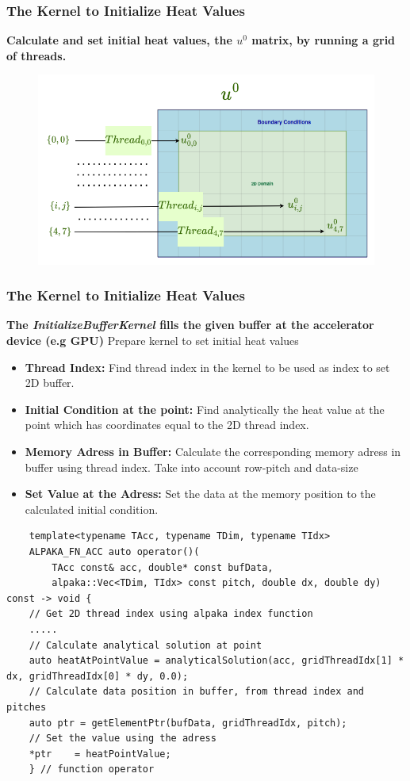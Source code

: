 \documentclass[9pt]{beamer}
\begin{document}
\begin{frame}
\frametitle{The Kernel to Initialize Heat Values}
\textbf{Calculate and set initial heat values, the $u^{0}$ matrix, by running a grid of threads.}
\hspace{2.0\baselineskip}
\begin{figure}
    \centering
    \includegraphics[width=0.8\linewidth]{Screenshot from 2024-09-19 18-45-43.png}
    \label{fig:enter-label}
\end{figure}
\end{frame}

\begin{frame}[fragile]
\frametitle{The Kernel to Initialize Heat Values}
\small

\textbf{ The \textit{InitializeBufferKernel} fills the given buffer at the accelerator device (e.g GPU)}
    \lstset{basicstyle=\ttfamily\scriptsize}
    Prepare kernel to set initial heat values
    \begin{itemize}
    \item \textbf{Thread Index:} Find thread index in the kernel to be used as index to set 2D buffer.
    \item \textbf{Initial Condition at the point:} Find analytically the heat value at the point which has coordinates equal to the 2D thread index.
    \item \textbf{Memory Adress in Buffer:} Calculate the corresponding memory adress in buffer using thread index. Take into account row-pitch and data-size
    \item \textbf{Set Value at the Adress:} Set the data at the memory position to the calculated initial condition.
    \end{itemize}
     \lstset{basicstyle=\ttfamily\tiny}
    \begin{lstlisting}
    template<typename TAcc, typename TDim, typename TIdx>
    ALPAKA_FN_ACC auto operator()(
        TAcc const& acc, double* const bufData,
        alpaka::Vec<TDim, TIdx> const pitch, double dx, double dy) const -> void {
    // Get 2D thread index using alpaka index function
    .....
    // Calculate analytical solution at point
    auto heatAtPointValue = analyticalSolution(acc, gridThreadIdx[1] * dx, gridThreadIdx[0] * dy, 0.0);
    // Calculate data position in buffer, from thread index and pitches
    auto ptr = getElementPtr(bufData, gridThreadIdx, pitch);
    // Set the value using the adress
    *ptr    = heatPointValue;
    } // function operator
    \end{lstlisting}

\end{frame}
\end{document}
